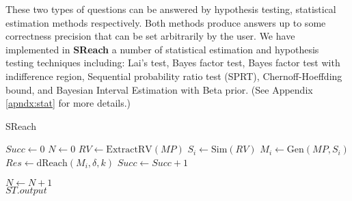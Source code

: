 These two types of questions can be answered by hypothesis testing, 
statistical estimation methods respectively. Both methods produce answers up to some correctness 
precision that can be set arbitrarily by the user.
We have implemented in {\bf SReach} a number of statistical estimation and hypothesis testing techniques including: {Lai's test}, {Bayes factor test}, {Bayes factor test with indifference region}, {Sequential probability ratio test (SPRT)}, {Chernoff-Hoeffding bound}, and Bayesian Interval Estimation with Beta prior. (See Appendix \ref{apndx:stat} for more details.) 
\vspace{-.5cm}
\begin{algorithm}
  \centering
  \caption{SReach}
  \label{fig:sreach}
  \begin{algorithmic}[1]
        \State $Succ \gets 0$	
        \State $N \gets 0$	
        \State $RV \gets \mathrm{ExtractRV}(MP)$	
        \Repeat
            \State $S_i \gets \mathrm{Sim}(RV)$		
            \State $M_i \gets \mathrm{Gen}(MP, S_i)$	
            \State $Res \gets \mathrm{dReach}(M_i, \delta, k)$	
		\State $Succ \gets Succ + 1$
	    
	  \EndIf
	\State $N \gets N + 1$
        	\\
	\quad\hspace{0.5ex} \Return $ST.output$
   \EndFunction
  \end{algorithmic}
\end{algorithm}
\vspace{-.3cm}
